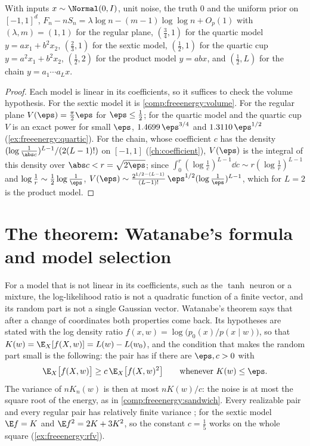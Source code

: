 \begin{refsection}
\begin{corollary}\label{cor:freeenergy:running}
With inputs $x\sim\Normal(0,I)$, unit noise, the truth $0$ and the uniform prior on $[-1,1]^d$, $F_n-nS_n=\lambda\log n-(m-1)\log\log n+O_p(1)$ with $(\lambda,m)=(1,1)$ for the regular plane, $(\tfrac34,1)$ for the quartic model $y=ax_1+b^2x_2$, $(\tfrac23,1)$ for the sextic model, $(\tfrac12,1)$ for the quartic cup $y=a^2x_1+b^2x_2$, $(\tfrac12,2)$ for the product model $y=abx$, and $(\tfrac12,L)$ for the chain $y=a_1\cdots a_Lx$.
\end{corollary}

\begin{proof}
Each model is linear in its coefficients, so it suffices to check the volume hypothesis. For the sextic model it is \cref{comp:freeenergy:volume}. For the regular plane $V(\eps)=\frac\pi2\eps$ for $\eps\le\frac12$; for the quartic model and the quartic cup $V$ is an exact power for small $\eps$, $1.4699\,\eps^{3/4}$ and $1.3110\,\eps^{1/2}$ (\cref{ex:freeenergy:quartic}). For the chain, whose coefficient $c$ has the density $(\log\frac1{\abs c})^{L-1}/(2(L-1)!)$ on $[-1,1]$ (\cref{ch:coefficient}), $V(\eps)$ is the integral of this density over $\abs c<r=\sqrt{2\eps}$; since $\int_0^r(\log\frac1c)^{L-1}\dd c\sim r(\log\frac1r)^{L-1}$ and $\log\frac1r\sim\frac12\log\frac1\eps$, $V(\eps)\sim\frac{2^{1/2-(L-1)}}{(L-1)!}\,\eps^{1/2}(\log\tfrac1\eps)^{L-1}$, which for $L=2$ is the product model.
\end{proof}

\section{The theorem: Watanabe's formula and model selection}\label{sec:freeenergy:main}

For a model that is not linear in its coefficients, such as the $\tanh$ neuron or a mixture, the log-likelihood ratio is not a quadratic function of a finite vector, and its random part is not a single Gaussian vector. Watanabe's theorem says that after a change of coordinates both properties come back. Its hypotheses are stated with the log density ratio $f(x,w)=\log\bigl(p_0(x)/p(x\mid w)\bigr)$, so that $K(w)=\E_X[f(X,w)]=L(w)-L(w_0)$, and the condition that makes the random part small is the following: the pair has  if there are $\eps,c>0$ with
\[
\E_X\bigl[f(X,w)\bigr]\ge c\,\E_X\bigl[f(X,w)^2\bigr]\qquad\text{whenever }K(w)\le\eps .
\]
The variance of $nK_n(w)$ is then at most $nK(w)/c$: the noise is at most the square root of the energy, as in \cref{comp:freeenergy:sandwich}. Every realizable pair and every regular pair has relatively finite variance \parencite[p.~872]{Watanabe2013}; for the sextic model $\E f=K$ and $\E f^2=2K+3K^2$, so the constant $c=\frac15$ works on the whole square (\cref{ex:freeenergy:rfv}).


\end{refsection}
